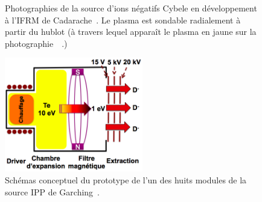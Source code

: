 \begin{refsection}
\begin{figure}[!htbp]
  \centering
    \caption{Photographies de la source d'ions négatifs Cybele en développement
    à l'IFRM de Cadarache~\parencite{SimoninHDR}. Le plasma est
    sondable radialement à partir du hublot (à travers lequel apparaît le
    plasma en jaune sur la photographie~~.)
    \label{4-cybelePhoto}} 
\end{figure}	

\begin{figure}[!htbp]
  \centering
    \includegraphics[height=5cm]{figures/sourceIPP.png}
    \caption{Schémas conceptuel du prototype de l'un des huits modules de la
    source IPP de Garching~\parencite{SimoninHDR}.
\label{4-GarchingSchema}}
\end{figure}


\end{refsection}
